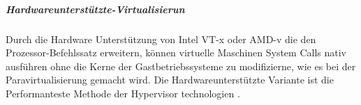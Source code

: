 \subparagraph{Hardwareunterstützte-Virtualisierun}
Durch die Hardware Unterstützung von Intel VT-x\cite{TechnologyIntel} oder AMD-v\cite{AMDVirtualisierungstechnologie} die den Prozessor-Befehlssatz erweitern, können virtuelle Maschinen System Calls nativ ausführen ohne die Kerne der Gastbetriebssysteme zu modifizierne, wie es bei der Paravirtualisierung gemacht wird. Die Hardwareunterstützte Variante ist die Performanteste Methode der Hypervisor technologien \cite{Meinel2011VirtualisierungMarktubersicht}.




